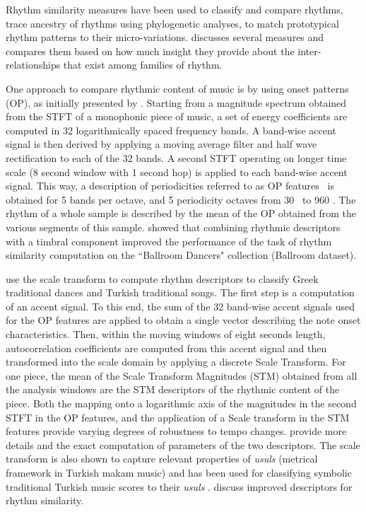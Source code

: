 Rhythm similarity measures have been used to classify and compare rhythms, trace ancestry of rhythms using phylogenetic analyses, to match prototypical rhythm patterns to their micro-variations.  discusses several measures and compares them based on how much insight they provide about the inter-relationships that exist among families of rhythm. 

One approach to compare rhythmic content of music is by using onset patterns (OP), as initially presented by . Starting from a magnitude spectrum obtained from the \gls{STFT} of a monophonic piece of music, a set of energy coefficients are computed in 32 logarithmically spaced frequency bands. A band-wise accent signal is then derived by applying a moving average filter and half wave rectification to each of the 32 bands. A second \gls{STFT} operating on longer time scale (8 second window with 1 second hop) is applied to each band-wise accent signal. This way, a description of periodicities referred to as OP features~\cite{holzapfel:11:RhythmSimSMC} is obtained for 5 bands per octave, and 5 periodicity octaves from 30 \bpm\ to 960 \bpm. The rhythm of a whole sample is described by the mean of the OP obtained from the various segments of this sample.  showed that combining rhythmic descriptors with a timbral component improved the performance of the task of rhythm similarity computation on the ``Ballroom Dancers" collection (Ballroom dataset). 

 use the scale transform to compute rhythm descriptors to classify Greek traditional dances and Turkish traditional songs. The first step is a computation of an accent signal. To this end, the sum of the 32 band-wise accent signals used for the OP features are applied to obtain a single vector describing the note onset characteristics. Then, within the moving windows of eight seconds length, autocorrelation coefficients are computed from this accent signal and then transformed into the scale domain by applying a discrete Scale Transform. For one piece, the mean of the Scale Transform Magnitudes (STM) obtained from all the analysis windows are the STM descriptors of the rhythmic content of the piece. Both the mapping onto a logarithmic axis of the magnitudes in the second \gls{STFT} in the OP features, and the application of a Scale transform in the STM features provide varying degrees of robustness to tempo changes.  provide more details and the exact computation of parameters of the two descriptors. The scale transform is also shown to capture relevant properties of \emph{usuls} (metrical framework in Turkish makam music) and has been used for classifying symbolic traditional Turkish music scores to their \emph{usuls} \cite{holzapfel:09:TurkRhythmSim}.  discuss improved descriptors for rhythm similarity. 

